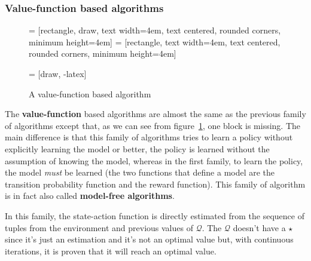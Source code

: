 \subsubsection{Value-function based algorithms}
\begin{figure} [ht]
     = [rectangle, draw, 
        text width=4em, text centered, rounded corners, minimum height=4em]
     = [rectangle, 
        text width=4em, text centered, rounded corners, minimum height=4em]
        
     = [draw, -latex]
    \centering
    \caption{A value-function based algorithm}
    \label{fig:value-function-based}
\end{figure}
\noindent
The \textbf{value-function} based algorithms are almost the same as the previous family of algorithms except that, as we can see from figure~\ref{fig:value-function-based}, one block is missing. The main difference is that this family of algorithms tries to learn a policy without explicitly learning the model or better, the policy is learned without the assumption of knowing the model, whereas in the first family, to learn the policy, the model \textit{must} be learned (the two functions that define a model are the transition probability function and the reward function).
This family of algorithm is in fact also called \textbf{model-free algorithms}.

In this family, the state-action function is directly estimated from the sequence of tuples from the environment and previous values of $\mathcal{Q}$. The $\mathcal{Q}$ doesn't have a $\star$ since it's just an estimation and it's not an optimal value but, with continuous iterations, it is proven that it will reach an optimal value.

